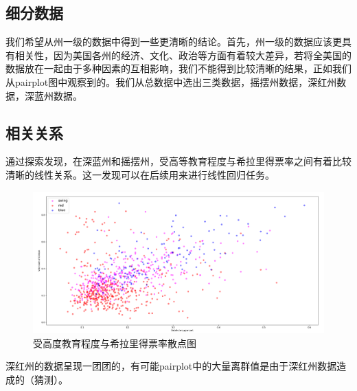 \documentclass[
12pt, %
UTF8
]{fphw}
\begin{document}
	\subsection{细分数据}
	我们希望从州一级的数据中得到一些更清晰的结论。首先，州一级的数据应该更具有相关性，因为美国各州的经济、文化、政治等方面有着较大差异，若将全美国的数据放在一起由于多种因素的互相影响，我们不能得到比较清晰的结果，正如我们从pairplot图中观察到的。我们从总数据中选出三类数据，摇摆州数据，深红州数据，深蓝州数据。
	\subsection{相关关系}
	通过探索发现，在深蓝州和摇摆州，受高等教育程度与希拉里得票率之间有着比较清晰的线性关系。这一发现可以在后续用来进行线性回归任务。
	\begin{figure}[H]
		\centering
		\includegraphics[scale=0.5]{bat_scatter.png}
		\caption{受高度教育程度与希拉里得票率散点图}
	\end{figure}
	深红州的数据呈现一团团的，有可能pairplot中的大量离群值是由于深红州数据造成的（猜测）。
\end{document}
